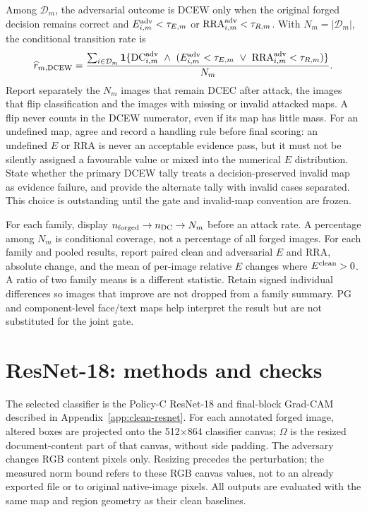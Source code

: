 Among $\mathcal{D}_m$, the adversarial outcome is DCEW only when the original forged decision remains correct and $E_{i,m}^{\rm adv}<\tau_{E,m}$ or $\mathrm{RRA}_{i,m}^{\rm adv}<\tau_{R,m}$. With $N_m=|\mathcal{D}_m|$, the conditional transition rate is
\begin{equation}
\widehat r_{m,\mathrm{DCEW}}=
\frac{\sum_{i\in\mathcal{D}_m}
\mathbf{1}\{\mathrm{DC}^{\rm adv}_{i,m}\ \land\
(E_{i,m}^{\rm adv}<\tau_{E,m}\ \lor\
\mathrm{RRA}_{i,m}^{\rm adv}<\tau_{R,m})\}}{N_m}.
\label{eq:app-adv-rate}
\end{equation}
Report separately the $N_m$ images that remain DCEC after attack, the images that flip classification and the images with missing or invalid attacked maps. A flip never counts in the DCEW numerator, even if its map has little mass. For an undefined map, agree and record a handling rule before final scoring: an undefined $E$ or RRA is never an acceptable evidence pass, but it must not be silently assigned a favourable value or mixed into the numerical $E$ distribution. State whether the primary DCEW tally treats a decision-preserved invalid map as evidence failure, and provide the alternate tally with invalid cases separated. This choice is outstanding until the gate and invalid-map convention are frozen.

For each family, display $n_{\rm forged}\rightarrow n_{\rm DC}\rightarrow N_m$ before an attack rate. A percentage among $N_m$ is conditional coverage, not a percentage of all forged images. For each family and pooled results, report paired clean and adversarial $E$ and RRA, absolute change, and the mean of per-image relative $E$ changes where $E^{\rm clean}>0$. A ratio of two family means is a different statistic. Retain signed individual differences so images that improve are not dropped from a family summary. PG and component-level face/text maps help interpret the result but are not substituted for the joint gate.

\section{ResNet-18: methods and checks}
\label{app:adv-resnet}

The selected classifier is the Policy-C ResNet-18 and final-block Grad-CAM described in Appendix~\ref{app:clean-resnet}. For each annotated forged image, altered boxes are projected onto the 512$\times$864 classifier canvas; $\Omega$ is the resized document-content part of that canvas, without side padding. The adversary changes RGB content pixels only. Resizing precedes the perturbation; the measured norm bound refers to these RGB canvas values, not to an already exported file or to original native-image pixels. All outputs are evaluated with the same map and region geometry as their clean baselines.

